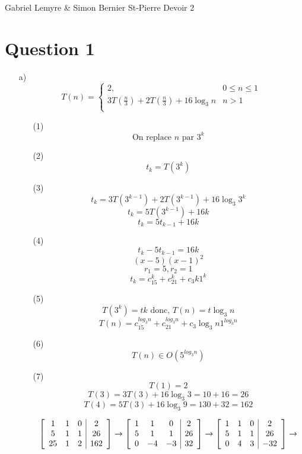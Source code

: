 \documentclass[10pt,letterpaper]{article}
\newenvironment{mymatrix}
{\left[ \begin{array}{ccc|c}}
{\end{array} \right]}
\begin{document}
	Gabriel Lemyre \& Simon Bernier St-Pierre \hfill Devoir 2\\
	\section*{Question 1}
	\begin{enumerate}
		\item[a)]
		$$
		T(n) =
		\begin{cases}
		2, & 0 \le n \le 1\\
		3T(\frac{n}{3}) + 2T(\frac{n}{3}) + 16 \log_3 n & n > 1 \\
		\end{cases}
		$$
		\begin{enumerate}
			\item[(1)] $$\text{On replace } n \text{ par } 3^k$$
			\item[(2)] $$t_k = T(3^k)$$
			\item[(3)]
			$$t_k = 3T(3^{k-1}) + 2T(3^{k-1}) + 16 \log_3 3^k$$
			$$t_k = 5T(3^{k-1}) + 16k$$
			$$t_k = 5t_{k-1} + 16k$$
			\item[(4)]
			$$t_k - 5t_{k-1} = 16k$$
			$$(x-5)(x-1)^2$$
			$$r_1 = 5, r_2 = 1$$
			$$t_k = c_15^k + c_21^k + c_3k1^k$$
			\item[(5)]
			$$T(3^k) = tk \text{ donc, } T(n) = t \log_3 n$$
			$$T(n) = c_15^{log_3 n} + c_21^{log_3 n} + c_3 \log_3 n1^{log_3 n}$$
			\item[(6)]
			$$T(n) \in O(5^{log_3 n})$$
			\item[(7)]
			$$T(1) = 2$$
			$$T(3) = 3T(3) + 16 \log_3 3 = 10 + 16 = 26$$
			$$T(4) = 5T(3) + 16 \log_3 9 = 130 + 32 = 162$$
			
			\[
			\begin{mymatrix}
			1 & 1 & 0 & 2\\
			5 & 1 & 1 & 26\\
			25 & 1 & 2 & 162\\
			\end{mymatrix}
			\rightarrow
			\begin{mymatrix}
			1 & 1 & 0 & 2\\
			5 & 1 & 1 & 26\\
			0 & -4 & -3 & 32\\
			\end{mymatrix}
			\rightarrow
			\begin{mymatrix}
			1 & 1 & 0 & 2\\
			5 & 1 & 1 & 26\\
			0 & 4 & 3 & -32\\
			\end{mymatrix}
			\rightarrow
			\]
			

\end{enumerate}
\end{enumerate}
\end{document}
